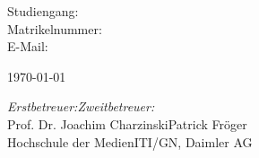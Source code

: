 \documentclass[../main.tex]{subfiles}
\begin{document}

\begin{titlepage}
	\centering
	{\scshape\LARGE
		\Hochschule
	\par}
	\vspace{1cm}
	{\scshape\Large
		\Dokument
	\par}
	\vspace{1.5cm}
	{\LARGE\bfseries
		\Thema
	\par}
	\vspace{2cm}
	{\large\itshape
		\Autor
	\par}
	\vspace{0.5cm}
	{\large
		Studiengang: \Studiengang\: \Matrikelnummer\\
		E-Mail: \texttt{\Email}
	\par}
	\vspace{1.5cm}
	{\large\today\par}
	\vfill
	{\large
		\emph{Erstbetreuer:}\hfill\emph{Zweitbetreuer:}\\
		Prof. Dr. Joachim Charzinski\hfill Patrick Fröger\\
		Hochschule der Medien\hfill ITI/GN, Daimler AG
	\par}
\end{titlepage}
\end{document}
